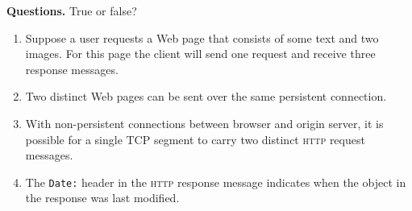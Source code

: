 \textbf{Questions.} True or false?
\begin{enumerate}

  \item Suppose a user requests a Web page that consists of some text
    and two images. For this page the client will send one request and
    receive three response messages.


  \item Two distinct Web pages can be sent over the same persistent
    connection.


  \item With non\hyp{}persistent connections between browser and
    origin ser\-ver, it is possible for a single TCP segment to carry
    two distinct \textsc{http} request messages.


  \item The \texttt{Date:} header in the \textsc{http} response
    message indicates when the object in the response was last
    modified.
   

\end{enumerate}
